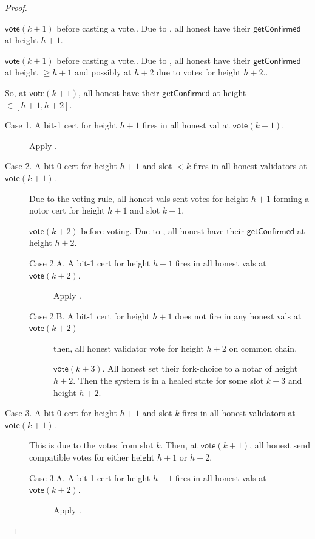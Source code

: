 \ifx\litemode\undefined\documentclass{article}\fi
\newcommand{\vote}{\mathsf{vote}}
\newcommand{\getConfirmed}{\textsf{getConfirmed}\xspace}
\theoremstyle{plain}
\theoremstyle{definition}
\theoremstyle{remark}
\begin{document}
\begin{proof}
{\begin{description}
  $\vote(k+1)$ before casting a vote..
  Due to , all honest have their $\getConfirmed$ at height $h+1$.

  \item[Case 2. Some honest for height $h+1$ at $\vote(k)$.]
  
  $\vote(k+1)$ before casting a vote..
  Due to , all honest have their $\getConfirmed$ at height $\geq h+1$ and possibly at $h+2$ due to votes for height $h+2$..
\end{description}

So, at $\vote(k+1)$, all honest have their $\getConfirmed$ at height $\in [h+1,h+2]$.

\begin{description}
  \item[Case 1. A bit-1 cert for height $h+1$ fires in all honest val at $\vote(k+1)$.]
  Apply .
  
  \item[Case 2. A bit-0 cert for height $h+1$ and slot $<k$ fires in all honest validators at $\vote(k+1)$.]
  Due to the voting rule, all honest vals sent votes for height $h+1$ forming a notor cert for height $h+1$ and slot $k+1$.

  $\vote(k+2)$ before voting. Due to , all honest have their $\getConfirmed$ at height $h+2$.

  \begin{description}
    \item[Case 2.A. A bit-1 cert for height $h+1$ fires in all honest vals at $\vote(k+2)$.] 
    Apply .
    \item[Case 2.B. A bit-1 cert for height $h+1$ does not fire in any honest vals at $\vote(k+2)$] 
    then, all honest validator vote for height $h+2$ on common chain.

    $\vote(k+3)$. All honest set their fork-choice to a notar of height $h+2$.
    Then the system is in a healed state for some slot $k+3$ and height $h+2$.
  \end{description}


  \item[Case 3. A bit-0 cert for height $h+1$ and slot $k$ fires in all honest validators at $\vote(k+1)$.]
  This is due to the votes from slot $k$.
  Then, at $\vote(k+1)$, all honest send compatible votes for either height $h+1$ or $h+2$.
  \begin{description}
    \item[Case 3.A. A bit-1 cert for height $h+1$ fires in all honest vals at $\vote(k+2)$.]
    Apply .


\end{description}
\end{description}}
\end{proof}
\end{document}
